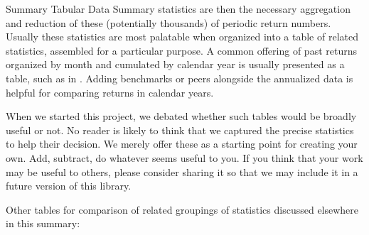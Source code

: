 \documentclass[12pt,letterpaper,english]{article}
\begin{document}
\begin{Section}{Summary Tabular Data}
Summary statistics are then the necessary aggregation and reduction of these (potentially thousands) of periodic return numbers. Usually these statistics are most palatable when organized into a table of related statistics, assembled for a particular purpose.  A common offering of past returns organized by month and cumulated by calendar year is usually presented as a table, such as in .  Adding benchmarks or peers alongside the annualized data is helpful for comparing returns in calendar years.

When we started this project, we debated whether such tables would be broadly useful or not.  No reader is likely to think that we captured the precise statistics to help their decision. We merely offer these as a starting point for creating your own.  Add, subtract, do whatever seems useful to you.  If you think that your work may be useful to others, please consider sharing it so that we may include it in a future version of this library.

Other tables for comparison of related groupings of statistics discussed elsewhere in this summary:
\end{Section}
\end{document}

